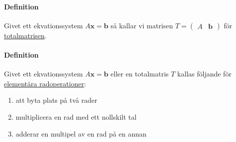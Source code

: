 \paragraph{Definition} Givet ett ekvationssystem $A\bm{x}=\bm{b}$ så kallar vi matrisen $T=\begin{pmatrix}A&\bm{b}\end{pmatrix}$ för \underline{totalmatrisen}.

\paragraph{Definition} Givet ett ekvationssystem $A\bm{x}=\bm{b}$ eller en totalmatris $T$ kallas följande för \underline{elementära radoperationer}:
\begin{enumerate}
    \item att byta plats på två rader
    \item multiplicera en rad med ett nollskilt tal
    \item adderar en multipel av en rad på en annan
\end{enumerate}